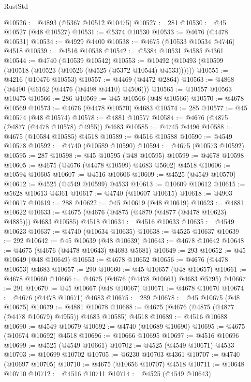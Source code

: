 \begin{lexlean}{RustStd}
\begin{coremodule}
@10526 := @4893 (@5367 @10512 @10475)
@10527 := 281
@10530 := @45 @10527 (@48 @10527)
@10531 := @5374 @10530
@10533 := @4676 (@4478 @10531)
@10534 := @4929 @4400
@10538 := @4675 (@10533 @10534 @4746) @4518
@10539 := @4516 @10538
@10542 := @5384 @10531 @4585 @4361
@10544 := @4740 (@10539 @10542)
@10553 := @10492 (@10493 (@10509 (@10518 (@10523 (@10526 (@4525 (@5372 @10544) @4533))))))
@10555 := @4216 (@10476 @10553)
@10557 := @4469 (@4472 @2864)
@10563 := @4868 (@4490 (@6162 (@4476 (@4498 @4410) @4506)))
@10565 := @10557 @10563 @10475
@10566 := 286
@10569 := @45 @10566 (@48 @10566)
@10570 := @4678 @10569
@10573 := @4676 (@4478 @10570) @4683
@10574 := 285
@10577 := @45 @10574 (@48 @10574)
@10578 := @4881 @10577
@10584 := @4676 (@4875 (@4877 (@4478 @10578) @4955)) @4683
@10585 := @4745 @4496
@10588 := @4675 (@10584 @10585) @4518
@10589 := @4516 @10588
@10590 := @4549 @10578
@10592 := @4740 (@10589 @10590)
@10594 := @4675 (@10573 @10592)
@10595 := 287
@10598 := @45 @10595 (@48 @10595)
@10599 := @4678 @10598
@10605 := @4675 (@4676 (@4478 @10599) @4683 @5602) @4518
@10606 := @10594 @10605
@10607 := @4516 @10606
@10609 := @4525 (@4549 @10570)
@10612 := @4525 (@4549 @10599) @4533
@10613 := @10609 @10612
@10615 := @5628 @10613 @4361
@10617 := @4740 (@10607 @10615)
@10618 := @4903 @10617
@10619 := 288
@10622 := @45 @10619 (@48 @10619)
@10623 := @4881 @10622
@10633 := @4675 (@4676 (@4875 (@4879 (@4877 (@4478 @10623) @4885))) @4683 @10585) @4518
@10634 := @4516 @10633
@10635 := @4549 @10623
@10637 := @4740 (@10634 @10635)
@10638 := @4525 @10637
@10639 := 292
@10642 := @45 @10639 (@48 @10639)
@10643 := @4678 @10642
@10648 := @4675 (@4676 (@4478 @10643) @4683 @5681)
@10649 := 293
@10652 := @45 @10649 (@48 @10649)
@10653 := @4678 @10652
@10656 := @4676 (@4478 @10653) @4683
@10657 := 290
@10660 := @45 @10657 (@48 @10657)
@10661 := @4678 @10660
@10666 := @4675 (@4676 (@4478 @10661) @4683 @5795)
@10667 := 291
@10670 := @45 @10667 (@48 @10667)
@10671 := @4678 @10670
@10674 := @4676 (@4478 @10671) @4683
@10675 := 289
@10678 := @45 @10675 (@48 @10675)
@10679 := @4881 @10678
@10688 := @4675 (@4676 (@4875 (@4877 (@4478 @10679) @4955)) @4683 @10585) @4518
@10689 := @4516 @10688
@10690 := @4549 @10679
@10692 := @4740 (@10689 @10690)
@10695 := @4675 (@10674 @10692) @4518
@10696 := @10666 @10695
@10697 := @4516 @10696
@10699 := @4525 (@4549 @10661)
@10702 := @4525 (@4549 @10671) @4533
@10703 := @10699 @10702
@10705 := @6230 @10703 @4361
@10707 := @4740 (@10697 @10705)
@10710 := @4675 (@10656 @10707) @4518
@10711 := @10648 @10710
@10712 := @4516 @10711
@10714 := @4525 (@4549 @10643)

\end{coremodule}
\end{lexlean}
